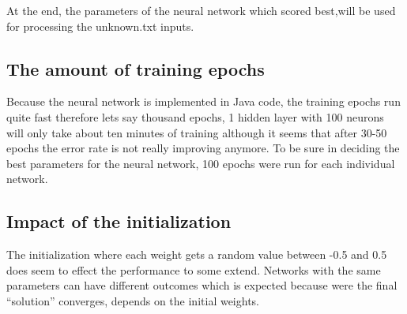 At the end, the parameters of the neural network which scored best,will be used for processing the unknown.txt inputs. 

 \subsection{The amount of training epochs}
 Because the neural network is implemented in Java code, the training epochs run quite fast therefore lets say thousand epochs, 1 hidden layer with 100 neurons will only take about ten minutes of training although it seems that after 30-50 epochs the error rate is not really improving anymore. To be sure in deciding the best parameters for the neural network, 100 epochs were run for each individual network.
 
 \subsection{Impact of the initialization}
 The initialization where each weight gets a random value between -0.5 and 0.5 does seem to effect the performance to some extend. Networks with the same parameters can have different outcomes which is expected because were the final \enquote{solution} converges, depends on the initial weights. 
